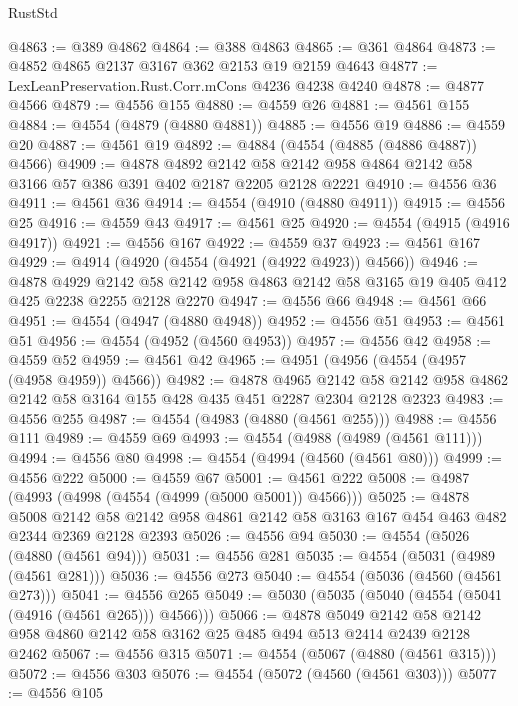 \begin{lexlean}{RustStd}
\begin{coremodule}
{\begin{coremodule}
{{{{{{{{{{{{{{{{@4863 := @389 @4862
@4864 := @388 @4863
@4865 := @361 @4864
@4873 := @4852 @4865 @2137 @3167 @362 @2153 @19 @2159 @4643
@4877 := LexLeanPreservation.Rust.Corr.mCons @4236 @4238 @4240
@4878 := @4877 @4566
@4879 := @4556 @155
@4880 := @4559 @26
@4881 := @4561 @155
@4884 := @4554 (@4879 (@4880 @4881))
@4885 := @4556 @19
@4886 := @4559 @20
@4887 := @4561 @19
@4892 := @4884 (@4554 (@4885 (@4886 @4887)) @4566)
@4909 := @4878
    @4892
    @2142
    @58
    @2142
    @958
    @4864
    @2142
    @58
    @3166
    @57
    @386
    @391
    @402
    @2187
    @2205
    @2128
    @2221
@4910 := @4556 @36
@4911 := @4561 @36
@4914 := @4554 (@4910 (@4880 @4911))
@4915 := @4556 @25
@4916 := @4559 @43
@4917 := @4561 @25
@4920 := @4554 (@4915 (@4916 @4917))
@4921 := @4556 @167
@4922 := @4559 @37
@4923 := @4561 @167
@4929 := @4914 (@4920 (@4554 (@4921 (@4922 @4923)) @4566))
@4946 := @4878
    @4929
    @2142
    @58
    @2142
    @958
    @4863
    @2142
    @58
    @3165
    @19
    @405
    @412
    @425
    @2238
    @2255
    @2128
    @2270
@4947 := @4556 @66
@4948 := @4561 @66
@4951 := @4554 (@4947 (@4880 @4948))
@4952 := @4556 @51
@4953 := @4561 @51
@4956 := @4554 (@4952 (@4560 @4953))
@4957 := @4556 @42
@4958 := @4559 @52
@4959 := @4561 @42
@4965 := @4951 (@4956 (@4554 (@4957 (@4958 @4959)) @4566))
@4982 := @4878
    @4965
    @2142
    @58
    @2142
    @958
    @4862
    @2142
    @58
    @3164
    @155
    @428
    @435
    @451
    @2287
    @2304
    @2128
    @2323
@4983 := @4556 @255
@4987 := @4554 (@4983 (@4880 (@4561 @255)))
@4988 := @4556 @111
@4989 := @4559 @69
@4993 := @4554 (@4988 (@4989 (@4561 @111)))
@4994 := @4556 @80
@4998 := @4554 (@4994 (@4560 (@4561 @80)))
@4999 := @4556 @222
@5000 := @4559 @67
@5001 := @4561 @222
@5008 := @4987 (@4993 (@4998 (@4554 (@4999 (@5000 @5001)) @4566)))
@5025 := @4878
    @5008
    @2142
    @58
    @2142
    @958
    @4861
    @2142
    @58
    @3163
    @167
    @454
    @463
    @482
    @2344
    @2369
    @2128
    @2393
@5026 := @4556 @94
@5030 := @4554 (@5026 (@4880 (@4561 @94)))
@5031 := @4556 @281
@5035 := @4554 (@5031 (@4989 (@4561 @281)))
@5036 := @4556 @273
@5040 := @4554 (@5036 (@4560 (@4561 @273)))
@5041 := @4556 @265
@5049 := @5030 (@5035 (@5040 (@4554 (@5041 (@4916 (@4561 @265))) @4566)))
@5066 := @4878
    @5049
    @2142
    @58
    @2142
    @958
    @4860
    @2142
    @58
    @3162
    @25
    @485
    @494
    @513
    @2414
    @2439
    @2128
    @2462
@5067 := @4556 @315
@5071 := @4554 (@5067 (@4880 (@4561 @315)))
@5072 := @4556 @303
@5076 := @4554 (@5072 (@4560 (@4561 @303)))
@5077 := @4556 @105
}}}}}}}}}}}}}}}}
\end{coremodule}}
\end{coremodule}
\end{lexlean}
